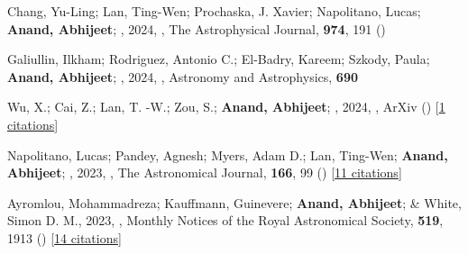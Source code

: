 \item[{\color{numcolor}\scriptsize5}] Chang, Yu-Ling; Lan, Ting-Wen; Prochaska, J. Xavier; Napolitano, Lucas; \textbf{Anand, Abhijeet}; \etal, 2024, , The Astrophysical Journal, \textbf{974}, 191 ()

\item[{\color{numcolor}\scriptsize4}] Galiullin, Ilkham; Rodriguez, Antonio C.; El-Badry, Kareem; Szkody, Paula; \textbf{Anand, Abhijeet}; \etal, 2024, , Astronomy and Astrophysics, \textbf{690}

\item[{\color{numcolor}\scriptsize3}] Wu, X.; Cai, Z.; Lan, T. -W.; Zou, S.; \textbf{Anand, Abhijeet}; \etal, 2024, , ArXiv () [\href{https://ui.adsabs.harvard.edu/abs/2024arXiv240717809W}{1 citations}]

\item[{\color{numcolor}\scriptsize2}] Napolitano, Lucas; Pandey, Agnesh; Myers, Adam D.; Lan, Ting-Wen; \textbf{Anand, Abhijeet}; \etal, 2023, , The Astronomical Journal, \textbf{166}, 99 () [\href{https://ui.adsabs.harvard.edu/abs/2023AJ....166...99N}{11 citations}]

\item[{\color{numcolor}\scriptsize1}] Ayromlou, Mohammadreza; Kauffmann, Guinevere; \textbf{Anand, Abhijeet}; \& White, Simon D. M., 2023, , Monthly Notices of the Royal Astronomical Society, \textbf{519}, 1913 () [\href{https://ui.adsabs.harvard.edu/abs/2023MNRAS.519.1913A}{14 citations}]